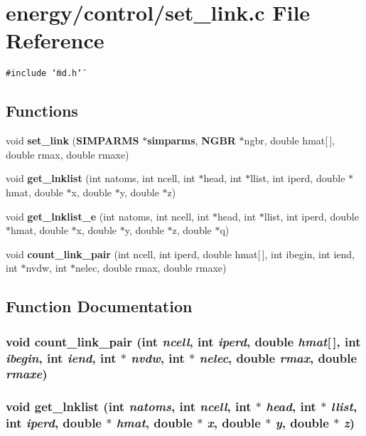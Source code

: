 \section{energy/control/set\_\-link.c File Reference}
\label{set__link_8c}
{\tt \#include \char`\"{}md.h\char`\"{}}\par
\subsection*{Functions}
\begin{CompactItemize}
\item 
void {\bf set\_\-link} ({\bf SIMPARMS} $\ast${\bf simparms}, {\bf NGBR} $\ast$ngbr, double hmat[$\,$], double rmax, double rmaxe)
\item 
void {\bf get\_\-lnklist} (int natoms, int ncell, int $\ast$head, int $\ast$llist, int iperd, double $\ast$hmat, double $\ast$x, double $\ast$y, double $\ast$z)
\item 
void {\bf get\_\-lnklist\_\-e} (int natoms, int ncell, int $\ast$head, int $\ast$llist, int iperd, double $\ast$hmat, double $\ast$x, double $\ast$y, double $\ast$z, double $\ast$q)
\item 
void {\bf count\_\-link\_\-pair} (int ncell, int iperd, double hmat[$\,$], int ibegin, int iend, int $\ast$nvdw, int $\ast$nelec, double rmax, double rmaxe)
\end{CompactItemize}


\subsection{Function Documentation}
\subsubsection{\setlength{\rightskip}{0pt plus 5cm}void count\_\-link\_\-pair (int {\em ncell}, int {\em iperd}, double {\em hmat}[$\,$], int {\em ibegin}, int {\em iend}, int $\ast$ {\em nvdw}, int $\ast$ {\em nelec}, double {\em rmax}, double {\em rmaxe})}\label{set__link_8c_5a375fad47b0b7a6e641889ca324a722}


\subsubsection{\setlength{\rightskip}{0pt plus 5cm}void get\_\-lnklist (int {\em natoms}, int {\em ncell}, int $\ast$ {\em head}, int $\ast$ {\em llist}, int {\em iperd}, double $\ast$ {\em hmat}, double $\ast$ {\em x}, double $\ast$ {\em y}, double $\ast$ {\em z})}\label{set__link_8c_f283e9626b9a61a07c3da74bd5ff2399}


